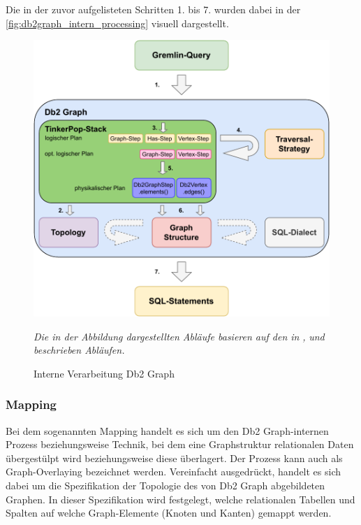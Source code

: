 Die in der zuvor aufgelisteten Schritten 1. bis 7. wurden dabei in der \autoref{fig:db2graph_intern_processing} visuell dargestellt.

\begin{figure}[ht]
    \centering
    \includegraphics[width=\textwidth]{images/db2graph_intern_processing.pdf}
    \caption{Interne Verarbeitung Db2 Graph}
    \label{fig:db2graph_intern_processing}
    \vspace{1em}
    \textit{Die in der Abbildung dargestellten Abläufe basieren auf den in} \cite{yt_tian}\textit{,} \cite{vldb_tian} \textit{und} \cite{sigmod_tian} \textit{beschrieben Abläufen.} 
\end{figure}

\subsubsection{Mapping}
Bei dem sogenannten Mapping handelt es sich um den Db2 Graph-internen Prozess beziehungsweise Technik, bei dem eine Graphstruktur relationalen Daten überge\-stülpt wird beziehungsweise diese überlagert. Der Prozess kann auch als Graph-Overlaying bezeichnet werden. Vereinfacht ausgedrückt, handelt es sich dabei um die Spezifikation der Topologie des von Db2 Graph abgebildeten Graphen. In dieser Spezifikation wird festgelegt, welche relationalen Tabellen und Spalten auf welche Graph-Elemente (Knoten und Kanten) gemappt werden. 

